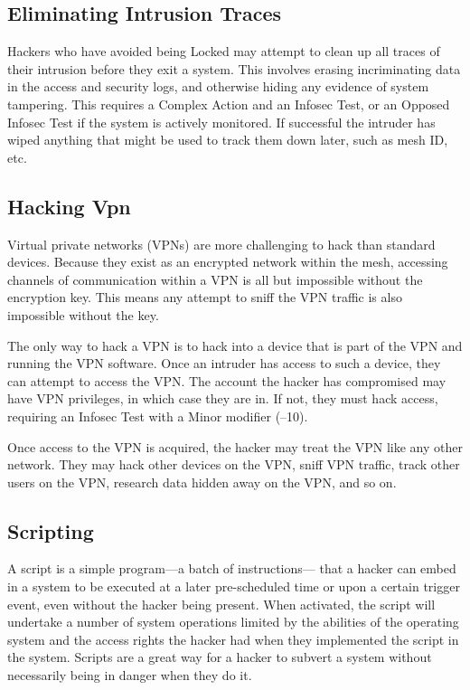 \subsection{Eliminating Intrusion Traces}

Hackers who have avoided being Locked may attempt 
to clean up all traces of their intrusion before they 
exit a system. This involves erasing incriminating data 
in the access and security logs, and otherwise hiding 
any evidence of system tampering. This requires a 
Complex Action and an Infosec Test, or an Opposed 
Infosec Test if the system is actively monitored. If successful
the intruder has wiped anything that might be
used to track them down later, such as mesh ID, etc.

\subsection{Hacking Vpn}

Virtual private networks (VPNs) are more challenging
to hack than standard devices. Because they exist
as an encrypted network within the mesh, accessing 
channels of communication within a VPN is all but 
impossible without the encryption key. This means 
any attempt to sniff the VPN traffic is also impossible
without the key.

The only way to hack a VPN is to hack into a 
device that is part of the VPN and running the VPN 
software. Once an intruder has access to such a device, 
they can attempt to access the VPN. The account the 
hacker has compromised may have VPN privileges, in 
which case they are in. If not, they must hack access, 
requiring an Infosec Test with a Minor modifier (–10).

Once access to the VPN is acquired, the hacker may 
treat the VPN like any other network. They may hack 
other devices on the VPN, sniff VPN traffic,  track 
other users on the VPN, research data hidden away 
on the VPN, and so on.

\subsection{Scripting}

A script is a simple program—a batch of instructions—
that a hacker can embed in a system to be executed at 
a later pre-scheduled time or upon a certain trigger 
event, even without the hacker being present. When 
activated, the script will undertake a number of system 
operations limited by the abilities of the operating 
system and the access rights the hacker had when 
they implemented the script in the system. Scripts are 
a great way for a hacker to subvert a system without 
necessarily being in danger when they do it.

